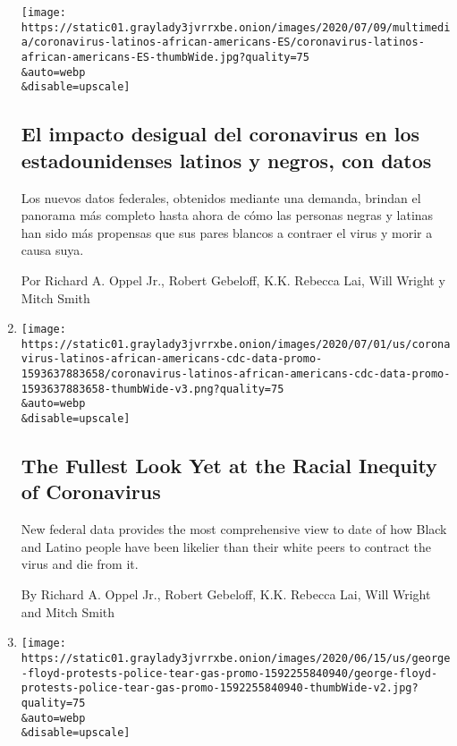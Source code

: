 \begin{enumerate}
  \texttt{[image: https://static01.graylady3jvrrxbe.onion/images/2020/07/09/multimedia/coronavirus-latinos-african-americans-ES/coronavirus-latinos-african-americans-ES-thumbWide.jpg?quality=75\\\&auto=webp\\\&disable=upscale]}

  \hypertarget{el-impacto-desigual-del-coronavirus-en-los-estadounidenses-latinos-y-negros-con-datos}{%
  \subsection{El impacto desigual del coronavirus en los estadounidenses
  latinos y negros, con
  datos}\label{el-impacto-desigual-del-coronavirus-en-los-estadounidenses-latinos-y-negros-con-datos}}

  Los nuevos datos federales, obtenidos mediante una demanda, brindan el
  panorama más completo hasta ahora de cómo las personas negras y
  latinas han sido más propensas que sus pares blancos a contraer el
  virus y morir a causa suya.

  Por Richard A. Oppel Jr., Robert Gebeloff, K.K. Rebecca Lai, Will
  Wright y Mitch Smith
\item
  \href{/interactive/2020/07/05/us/coronavirus-latinos-african-americans-cdc-data.html}{}

  \texttt{[image: https://static01.graylady3jvrrxbe.onion/images/2020/07/01/us/coronavirus-latinos-african-americans-cdc-data-promo-1593637883658/coronavirus-latinos-african-americans-cdc-data-promo-1593637883658-thumbWide-v3.png?quality=75\\\&auto=webp\\\&disable=upscale]}

  \hypertarget{the-fullest-look-yet-at-the-racial-inequity-of-coronavirus}{%
  \subsection{The Fullest Look Yet at the Racial Inequity of
  Coronavirus}\label{the-fullest-look-yet-at-the-racial-inequity-of-coronavirus}}

  New federal data provides the most comprehensive view to date of how
  Black and Latino people have been likelier than their white peers to
  contract the virus and die from it.

  By Richard A. Oppel Jr., Robert Gebeloff, K.K. Rebecca Lai, Will
  Wright and Mitch Smith
\item
  \href{/interactive/2020/06/16/us/george-floyd-protests-police-tear-gas.html}{}

  \texttt{[image: https://static01.graylady3jvrrxbe.onion/images/2020/06/15/us/george-floyd-protests-police-tear-gas-promo-1592255840940/george-floyd-protests-police-tear-gas-promo-1592255840940-thumbWide-v2.jpg?quality=75\\\&auto=webp\\\&disable=upscale]}


\end{enumerate}
